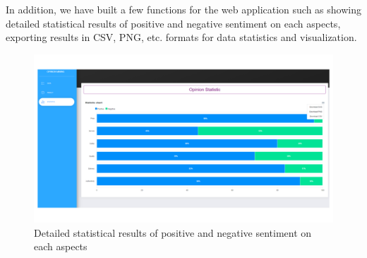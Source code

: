 In addition, we have built a few functions for the web application such as showing detailed statistical results of positive and negative sentiment on each aspects, exporting results in CSV, PNG, etc. formats for data statistics and visualization.

\begin{figure}[h]
	\centering
	\includegraphics[width=\linewidth]{Chapter4/Figs/tool5.png}
	\caption{Detailed statistical results of positive and negative sentiment on each aspects}
	\label{fig:tool5}
\end{figure}
